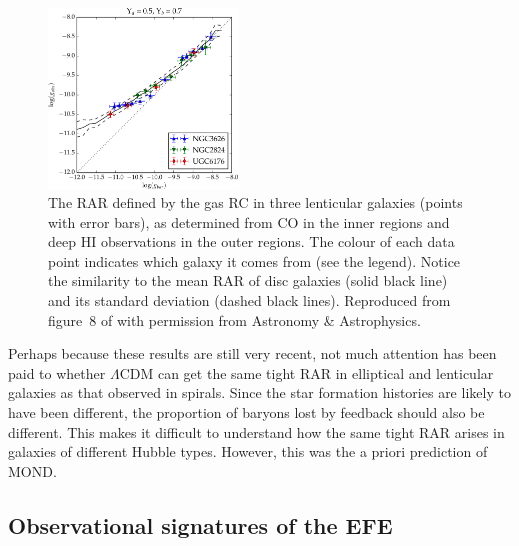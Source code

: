 \documentclass[fleqn,usenatbib,useAMS,onecolumn]{mnras} %
\begin{document}
\begin{figure}
	\centering
	\includegraphics[width=0.45\textwidth]{Shelest_2020_Figure_8_AUTHOR}
	\caption{The RAR defined by the gas RC in three lenticular galaxies (points with error bars), as determined from CO in the inner regions and deep HI observations in the outer regions. The colour of each data point indicates which galaxy it comes from (see the legend). Notice the similarity to the mean RAR of disc galaxies (solid black line) and its standard deviation (dashed black lines). Reproduced from figure~8 of \citet{Shelest_2020} with permission from Astronomy \& Astrophysics.}
	\label{Shelest_2020_Figure_8}
\end{figure}

Perhaps because these results are still very recent, not much attention has been paid to whether $\Lambda$CDM can get the same tight RAR in elliptical and lenticular galaxies as that observed in spirals. Since the star formation histories are likely to have been different, the proportion of baryons lost by feedback should also be different. This makes it difficult to understand how the same tight RAR arises in galaxies of different Hubble types. However, this was the a priori prediction of MOND.



\subsection{Observational signatures of the EFE}
\label{EFE_observations}

\end{document}
